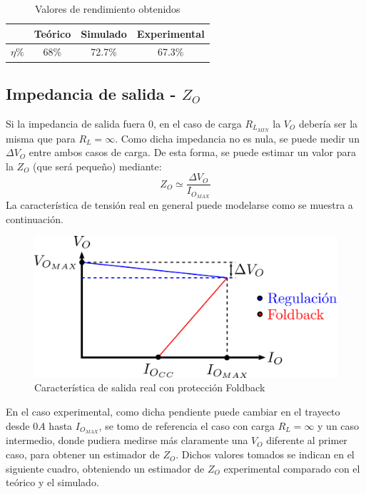 \begin{table}[!ht]
\begin{center}
\begin{tabular}{|c||c|c|c|}
\hline
& Te\'orico & Simulado & Experimental\\
\hline 
$\eta \%$ & 68\% & 72.7\% & 67.3\%\\
\hline 
\end{tabular}
\end{center}

\caption{Valores de rendimiento obtenidos}
\end{table}

\subsection{Impedancia de salida - $Z_O$}
 
Si la impedancia de salida fuera 0, en el caso de carga $R_{L_{MIN}}$ la $V_O$ deber\'ia ser la misma que para $R_L = \infty $. Como dicha impedancia no es nula, se puede medir un $\Delta V_O$ entre ambos casos de carga. De esta forma, se puede estimar un valor para la $Z_O$ (que ser\'a peque\~no) mediante:
\[
Z_O \simeq \frac{\Delta V_O}{I_{O_{MAX}}}   
\]
La caracter\'istica de tensi\'on real en general puede modelarse como se muestra a continuaci\'on.

\begin{figure}[!ht]
\begin{centering}
\includegraphics[scale=0.5]{Imagenes/FB_Real.png}
\par\end{centering}
\caption{Caracter\'istica de salida real con protecci\'on Foldback}

\end{figure}

En el caso experimental, como dicha pendiente puede cambiar en el trayecto desde $0A$ hasta $I_{O_{MAX}}$, se tomo de referencia el caso con carga $R_L = \infty$ y un caso intermedio, donde pudiera medirse m\'as claramente una $V_O$ diferente al primer caso, para obtener un estimador de $Z_O$. Dichos valores tomados se indican en el siguiente cuadro, obteniendo un estimador de $Z_O$ experimental comparado con el te\'orico y el simulado.


